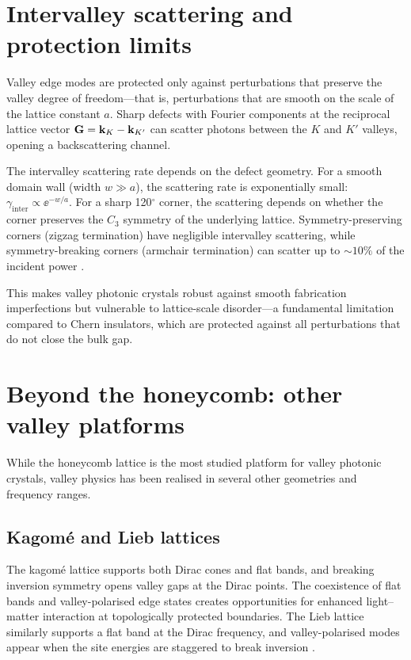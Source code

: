\section{Intervalley scattering and protection limits}
\label{sec:ch12-intervalley-backscattering}

Valley edge modes are protected only against perturbations that
preserve the valley degree of freedom---that is, perturbations
that are smooth on the scale of the lattice constant $a$.  Sharp
defects with Fourier components at the reciprocal lattice vector
$\mathbf{G}=\mathbf{k}_K-\mathbf{k}_{K'}$ can scatter photons between the
$K$ and $K'$ valleys, opening a backscattering channel.

The intervalley scattering rate depends on the defect geometry.  For
a smooth domain wall (width $w\gg a$), the scattering rate is
exponentially small: $\gamma_{\mathrm{inter}}\propto\ee^{-w/a}$.
For a sharp 120$^\circ$ corner, the scattering depends on whether the
corner preserves the $C_3$ symmetry of the underlying lattice.
Symmetry-preserving corners (zigzag termination) have negligible
intervalley scattering, while symmetry-breaking corners (armchair
termination) can scatter up to $\sim 10\%$ of the incident power
\cite{dong2016valley,wu2017direct,gao2017valley}.

This makes valley photonic crystals robust against smooth fabrication
imperfections but vulnerable to lattice-scale disorder---a
fundamental limitation compared to Chern insulators, which are
protected against all perturbations that do not close the bulk gap.

\section{Beyond the honeycomb: other valley platforms}
\label{sec:ch12-other-platforms}

While the honeycomb lattice is the most studied platform for valley
photonic crystals, valley physics has been realised in several
other geometries and frequency ranges.

\subsection{Kagomé and Lieb lattices}
\label{sec:ch12-kagome}

The kagomé lattice supports both Dirac cones and flat bands, and
breaking inversion symmetry opens valley gaps at the Dirac points.
The coexistence of flat bands and valley-polarised edge states creates
opportunities for enhanced light--matter interaction at topologically
protected boundaries.  The Lieb lattice similarly supports a flat
band at the Dirac frequency, and valley-polarised modes appear when
the site energies are staggered to break inversion
\cite{ozawa2018topological}.

